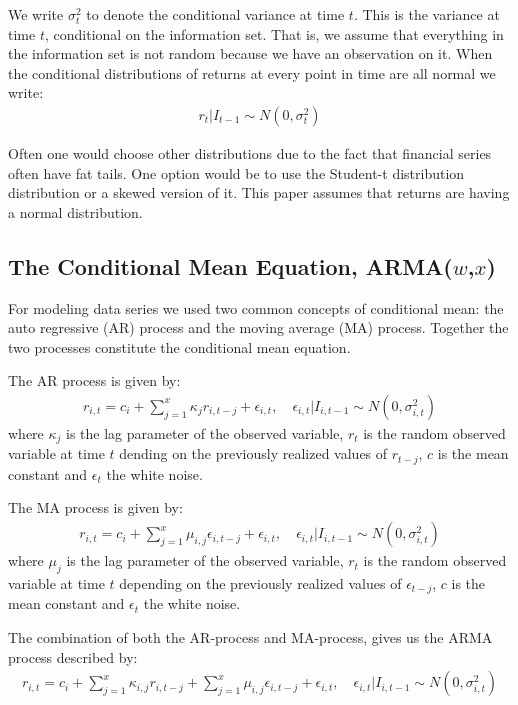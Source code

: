 We write $\sigma_t^2$ to denote the conditional variance at time $t$. This is the variance at time $t$, conditional on the information set. That is, we assume that everything in the information set is not random because we have an observation on it. When the conditional distributions of returns at every point in time are all normal we write:
\begin{align}
    r_t | I_{t-1} \sim N(0,{\sigma_t^2})
\end{align}

Often one would choose other distributions due to the fact that financial
series often have fat tails. One option would be to use the Student-t
distribution distribution or a skewed version of it. This paper assumes that returns are having a normal distribution. 

\subsection*{The Conditional Mean Equation, ARMA($w$,$x$)}

For modeling data series we used two common concepts of conditional mean: the auto regressive (AR) process and the moving average (MA) process. Together the two processes constitute the conditional mean equation. 

The AR process is given by:
\begin{align}
    r_{i,t}=c_i + \sum_{j=1}^x\kappa_j r_{i,t-j} + \epsilon_{i,t},\quad \epsilon_{i,t} | I_{i,t-1} \sim N(0,{\sigma_{i,t}^2}) \label{ConditionalMeanEquation}
\end{align}
where $\kappa_j$ is the lag parameter of the observed variable, $r_t$ is the random observed variable at time $t$ dending on the previously realized values of $r_{t-j}$, $c$ is the mean constant and $\epsilon_t$ the white noise.

The MA process is given by:
\begin{align}
    r_{i,t}=c_i + \sum_{j=1}^x\mu_{i,j} \epsilon_{i,t-j} + \epsilon_{i,t},\quad \epsilon_{i,t} | I_{i,t-1} \sim N(0,{\sigma_{i,t}^2}) \label{ConditionalMeanEquation}
\end{align}
where $\mu_j$ is the lag parameter of the observed variable, $r_t$ is the random observed variable at time $t$ depending on the previously realized values of $\epsilon_{t-j}$, $c$ is the mean constant and $\epsilon_t$ the white noise.

The combination of both the AR-process and MA-process, gives us the ARMA process described by:
\begin{align}
    r_{i,t}=c_i+\sum_{j=1}^x\kappa_{i,j} r_{i,t-j}+\sum_{j=1}^x\mu_{i,j} \epsilon_{i,t-j}+\epsilon_{i,t},\quad \epsilon_{i,t} | I_{i,t-1} \sim N(0,{\sigma_{i,t}^2}) \label{ConditionalMeanEquation}
\end{align}

